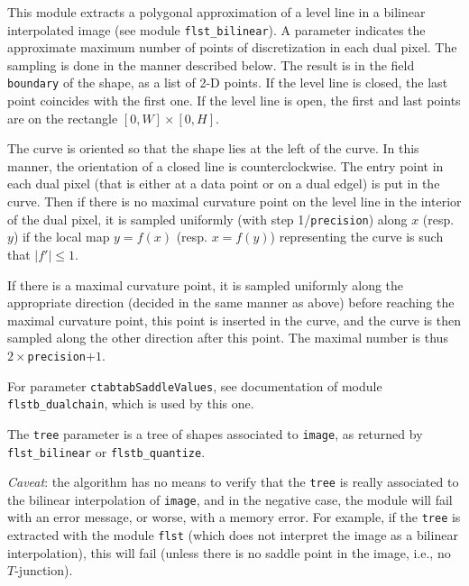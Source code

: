 This module extracts a polygonal approximation of a level line in a bilinear
interpolated image (see module \texttt{flst\_bilinear}). A parameter indicates
the approximate maximum number of points of discretization in each dual
pixel. The sampling is done in the manner described below. The result is in
the field \texttt{boundary} of the shape, as a list of 2-D points. If the
level line is closed, the last point coincides with the first one. If the
level line is open, the first and last points are on the rectangle
$[0,W]\times [0,H]$.

The curve is oriented so that the shape lies at the left of the curve. In this
manner, the orientation of a closed line is counterclockwise. The entry point
in each dual pixel (that is either at a data point or on a dual edgel) is put
in the curve. Then if there is no maximal curvature point on the level line in
the interior of the dual pixel, it is sampled uniformly (with step
1/\texttt{precision}) along $x$ (resp. $y$) if
the local map $y=f(x)$ (resp. $x=f(y)$) representing the curve is such that
$|f'|\leq 1$.

If there is a maximal curvature point, it is sampled uniformly along the
appropriate direction (decided in the same manner as above) before reaching
the maximal curvature point, this point is inserted in the curve, and the
curve is then sampled along the other direction after this point.
The maximal number is thus $2\times$\texttt{precision}$+1$.

For parameter \texttt{ctabtabSaddleValues}, see documentation of module
\texttt{flstb\_dualchain}, which is used by this one.

The \texttt{tree} parameter is a tree of shapes associated to \texttt{image},
as returned by \texttt{flst\_bilinear} or \texttt{flstb\_quantize}. 

{\em Caveat}: the algorithm has no means to verify that the \texttt{tree} is
really associated to the bilinear interpolation of \texttt{image}, and in the
negative case, the module will fail with an error message, or worse, with a
memory error. For example, if the \texttt{tree} is extracted with the module
\texttt{flst} (which does not interpret the image as a bilinear
interpolation), this will fail (unless there is no saddle point in the
image, i.e., no $T$-junction).
